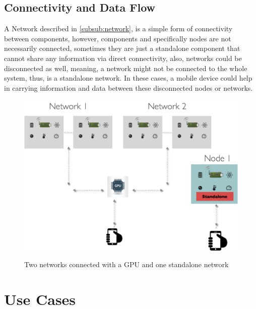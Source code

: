 \subsection{Connectivity and Data Flow}
A Network described in \ref{subsub:network}, is a simple form of connectivity between components, however, components and specifically nodes are not necessarily connected, sometimes they are just a standalone component that cannot share any information via direct connectivity, also, networks could be disconnected as well, meaning, a network might not be connected to the whole system, thus, is a standalone network. In these cases, a mobile device could help in carrying information and data between these disconnected nodes or networks. 

\begin{figure}[H]
	\centering
	\includegraphics[scale=0.5]{images/system.png}
	\label{fig:system}
	\caption{Two networks connected with a GPU and one standalone network}
\end{figure}





\section{Use Cases}
